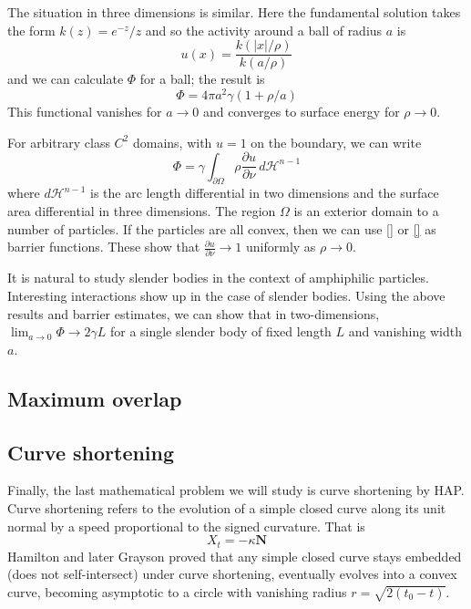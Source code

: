 \documentclass[12pt]{article}
\begin{document}
The situation in three dimensions is similar. Here the fundamental solution takes the form
$k(z) = e^{-z}/z$ and so the activity around a ball of radius $a$ is 
\begin{equation}
    u(x) = \frac{k(|x|/\rho)}{k(a/\rho)}
\end{equation}
and we can calculate $\Phi$ for a ball; the result is 
\begin{equation}
\Phi = 4 \pi a^2 \gamma ( 1 + \rho/a)
\end{equation}
This functional vanishes for $a \to 0$ and converges to surface energy for $\rho \to 0.$

For arbitrary class $C^2$ domains, with $u = 1$ on the boundary, we can write
\begin{equation}
    \Phi = \gamma \int_{\partial \Omega} \rho \frac{\partial u}{\partial \nu} \,d \mathcal{H}^{n-1}
\end{equation}
where $d \mathcal{H}^{n-1}$ is the arc length differential in two dimensions and the surface area differential in three dimensions. The region $\Omega$ is an exterior domain to a number of particles.
If the particles are all convex, then we can use \eqref{} or \eqref{} as barrier functions. These 
show that $\frac{\partial u}{\partial \nu} \to 1$ uniformly as $\rho \to 0$.

It is natural to study slender bodies in the context of  amphiphilic particles. 
Interesting interactions show up in the case of slender bodies. Using the above results
and barrier estimates, we can show that in two-dimensions, $\lim_{a \to 0} \Phi \to 2\gamma L$ for a single slender body of fixed length $L$ and vanishing width $a$. 

\subsection{Maximum overlap}
\subsection{Curve shortening}
Finally, the last mathematical problem we will study is curve shortening by HAP. Curve shortening refers to the evolution of a simple closed curve along its unit normal
by a speed proportional to the signed curvature. That is 
\begin{equation}
    X_t = -\kappa \mathbf{N}
\end{equation}
Hamilton and later Grayson proved that any simple closed curve stays embedded (does not
self-intersect) under curve shortening, eventually evolves into a convex curve, becoming 
asymptotic to a circle with vanishing radius $r = \sqrt{2(t_0 - t)}$.
\end{document}
